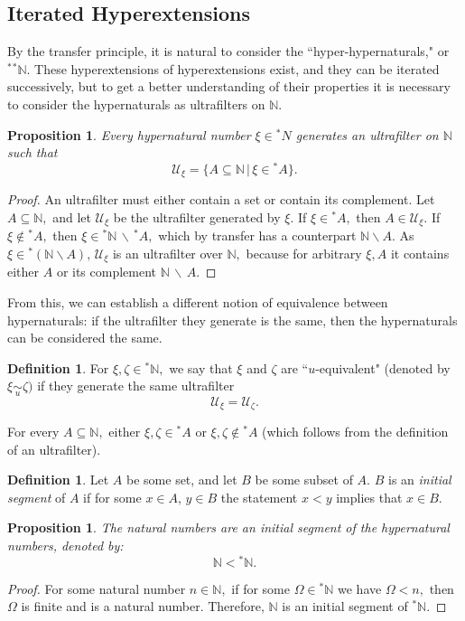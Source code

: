\documentclass[12pt]{amsart}
\newcommand{\stt}{{}^*}
\newcommand{\NN}{\mathbb{N}}
\newcommand{\mcU}{\mathcal{U}}
\theoremstyle{plain}
\newtheorem{prop}[thm]{Proposition}
\theoremstyle{definition}
\newtheorem{defn}[thm]{Definition}
\theoremstyle{remark}
\theoremstyle{theorem}
\numberwithin{equation}{section}
\numberwithin{thm}{section}
\begin{document}
\subsection{Iterated Hyperextensions}
By the transfer principle, it is natural to consider the ``hyper-hypernaturals," or $\stt \stt \NN.$ These hyperextensions of hyperextensions exist, and they can be iterated successively, but to get a better understanding of their properties it is necessary to consider the hypernaturals as ultrafilters on $\NN.$
\begin{prop}
Every hypernatural number $\xi \in \stt N$ generates an ultrafilter on $\NN$ such that
\[\mcU_\xi = \{A \subseteq \NN \, | \, \xi \in \stt A \}. \]
\end{prop}
\begin{proof}
An ultrafilter must either contain a set or contain its complement. Let $A \subseteq \NN,$ and let $\mcU_\xi$ be the ultrafilter generated by $\xi.$ If $\xi \in \stt A,$ then $A \in \mcU_\xi.$ If $\xi \not\in \stt A,$ then $\xi \in \stt \NN \, \backslash \, \stt A,$ which by transfer has a counterpart $\NN \backslash A.$ As $\xi \in \stt ( \NN \backslash A), \, \mcU_\xi$ is an ultrafilter over $\NN,$ because for arbitrary $\xi, A$ it contains either $A$ or its complement $\NN \, \backslash \, A.$
\end{proof}
From this, we can establish a different notion of equivalence between hypernaturals: if the ultrafilter they generate is the same, then the hypernaturals can be considered the same.
\begin{defn}
For $\xi, \zeta \in \stt \NN,$ we say that $\xi$ and $\zeta$ are ``$u$-equivalent" (denoted by $\xi \underset{u}{\sim} \zeta)$ if they generate the same ultrafilter \[\mcU_\xi = \mcU_\zeta.\] 
\end{defn}
For every $A \subseteq \NN,$ either $\xi, \zeta \in \stt A$ or $\xi, \zeta \not \in \stt A$ (which follows from the definition of an ultrafilter).
\begin{defn}
Let $A$ be some set, and let $B$ be some subset of $A.$ $B$ is an \textit{initial segment} of $A$ if for some $x \in A, \, y \in B$ the statement $x < y$ implies that $x \in B.$
\end{defn}
\begin{prop}
The natural numbers are an initial segment of the hypernatural numbers, denoted by: \[ \NN < \stt \NN.\]
\end{prop}
\begin{proof}
For some natural number $n \in \NN,$ if for some $\Omega \in \stt \NN$ we have $\Omega < n,$ then $\Omega$ is finite and is a natural number. Therefore, $\NN$ is an initial segment of $\stt \NN.$
\end{proof}
\end{document}

